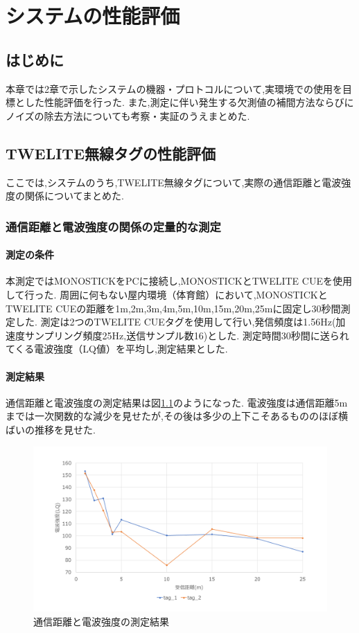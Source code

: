
\chapter{システムの性能評価}\label{chap3}
\section{はじめに}
本章では2章で示したシステムの機器・プロトコルについて,実環境での使用を目標とした性能評価を行った.
また,測定に伴い発生する欠測値の補間方法ならびにノイズの除去方法についても考察・実証のうえまとめた.

\section{TWELITE無線タグの性能評価}\label{TWELITEs}
ここでは,システムのうち,TWELITE無線タグについて,実際の通信距離と電波強度の関係についてまとめた.

\subsection{通信距離と電波強度の関係の定量的な測定}
\subsubsection{測定の条件}
本測定ではMONOSTICKをPCに接続し,MONOSTICKとTWELITE CUEを使用して行った.
周囲に何もない屋内環境（体育館）において,MONOSTICKとTWELITE CUEの距離を1m,2m,3m,4m,5m,10m,15m,20m,25mに固定し30秒間測定した.
測定は2つのTWELITE CUEタグを使用して行い,発信頻度は1.56Hz(加速度サンプリング頻度25Hz,送信サンプル数16)とした.
測定時間30秒間に送られてくる電波強度（LQ値）を平均し,測定結果とした.


\subsubsection{測定結果}
通信距離と電波強度の測定結果は図\ref{LQ25}のようになった.
電波強度は通信距離5mまでは一次関数的な減少を見せたが,その後は多少の上下こそあるもののほぼ横ばいの推移を見せた.


\begin{figure}[!htb]
  \centering
  \includegraphics[width = 15cm, bb= 0 0 1000 600]{chapter3/LQ25.png}
  \caption{通信距離と電波強度の測定結果}
  \label{LQ25}
\end{figure}
\clearpage


